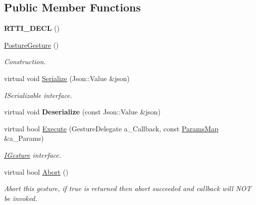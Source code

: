 \subsection*{Public Member Functions}
\begin{DoxyCompactItemize}
\item 
\mbox{\label{class_posture_gesture_aedf72ae1de2d09f720066f9801b7fa48}} 
{\bfseries R\+T\+T\+I\+\_\+\+D\+E\+CL} ()
\item 
\mbox{\label{class_posture_gesture_ae906c769dbc4e50dea25129deb212208}} 
\hyperlink{class_posture_gesture_ae906c769dbc4e50dea25129deb212208}{Posture\+Gesture} ()
\begin{DoxyCompactList}\small\item\em Construction. \end{DoxyCompactList}\item 
\mbox{\label{class_posture_gesture_a524f24cca8768995776e491f0e974698}} 
virtual void \hyperlink{class_posture_gesture_a524f24cca8768995776e491f0e974698}{Serialize} (Json\+::\+Value \&json)
\begin{DoxyCompactList}\small\item\em I\+Serializable interface. \end{DoxyCompactList}\item 
\mbox{\label{class_posture_gesture_aed25ed4ac03cb50dedf0da4420e5727f}} 
virtual void {\bfseries Deserialize} (const Json\+::\+Value \&json)
\item 
\mbox{\label{class_posture_gesture_a0bfa3f0e2b3a9b3897ca69d4aa9aff2b}} 
virtual bool \hyperlink{class_posture_gesture_a0bfa3f0e2b3a9b3897ca69d4aa9aff2b}{Execute} (Gesture\+Delegate a\+\_\+\+Callback, const \hyperlink{class_params_map}{Params\+Map} \&a\+\_\+\+Params)
\begin{DoxyCompactList}\small\item\em \hyperlink{class_i_gesture}{I\+Gesture} interface. \end{DoxyCompactList}\item 
\mbox{\label{class_posture_gesture_a354d34f7c01397c192bf57dc70bdf749}} 
virtual bool \hyperlink{class_posture_gesture_a354d34f7c01397c192bf57dc70bdf749}{Abort} ()
\begin{DoxyCompactList}\small\item\em Abort this gesture, if true is returned then abort succeeded and callback will N\+OT be invoked. \end{DoxyCompactList}\end{DoxyCompactItemize}
